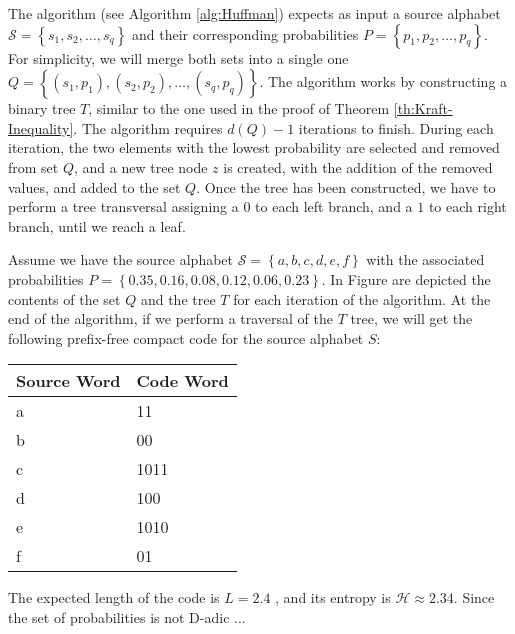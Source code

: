 The algorithm (see Algorithm \ref{alg:Huffman}) expects as input a source alphabet $\mathcal{S}=\left\{ s_{1},s_{2},\ldots,s_{q}\right\}$ and their corresponding probabilities $P = \left\{ p_{1}, p_{2}, \ldots, p_{q} \right\}$. For simplicity, we will merge both sets into a single one $Q = \left\{ (s_{1}, p_{1}), (s_{2}, p_{2}), \ldots, (s_{q}, p_{q}) \right\}$. The algorithm works by constructing a binary tree $T$, similar to the one used in the proof of Theorem \ref{th:Kraft-Inequality}. The algorithm requires $d(Q) - 1$ iterations to finish. During each iteration, the two elements with the lowest probability are selected and removed from set $Q$, and a new tree node $z$ is created, with the addition of the removed values, and added to the set $Q$. Once the tree has been constructed, we have to perform a tree transversal assigning a $0$ to each left branch, and a $1$ to each right branch, until we reach a leaf.

\begin{example}
Assume we have the source alphabet $\mathcal{S}=\left\{a, b, c, d, e, f\right\}$ with the associated probabilities $P = \left\{0.35, 0.16, 0.08, 0.12, 0.06, 0.23 \right\}$. In Figure \label{fig:Huffman-Algorithm} are depicted the contents of the set $Q$ and the tree $T$ for each iteration of the algorithm. At the end of the algorithm, if we perform a traversal of the $T$ tree, we will get the following prefix-free compact code for the source alphabet $S$: 

\bigskip

\centering
\begin{tabular}{l l}
\toprule
\textbf{Source Word} & \textbf{Code Word} \\
\midrule
a & 11   \\
b & 00   \\
c & 1011 \\
d & 100  \\
e & 1010 \\
f & 01   \\
\bottomrule
\end{tabular}

\bigskip

The expected length of the code is $L = 2.4$ , and its entropy is $\mathcal{H} \approx 2.34$. Since the set of probabilities is not D-adic ...


\end{example}

